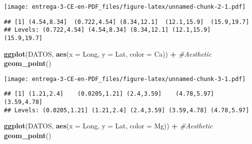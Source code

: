 \documentclass[
]{article}
\newenvironment{Shaded}{\begin{snugshade}}{\end{snugshade}}
\newcommand{\CommentTok}[1]{\textcolor[rgb]{0.56,0.35,0.01}{\textit{#1}}}
\newcommand{\DataTypeTok}[1]{\textcolor[rgb]{0.13,0.29,0.53}{#1}}
\newcommand{\DecValTok}[1]{\textcolor[rgb]{0.00,0.00,0.81}{#1}}
\newcommand{\KeywordTok}[1]{\textcolor[rgb]{0.13,0.29,0.53}{\textbf{#1}}}
\newcommand{\NormalTok}[1]{#1}
\newcommand{\OperatorTok}[1]{\textcolor[rgb]{0.81,0.36,0.00}{\textbf{#1}}}
\newcommand{\StringTok}[1]{\textcolor[rgb]{0.31,0.60,0.02}{#1}}
\begin{document}
\texttt{[image: entrega-3-CE-en-PDF\_files/figure-latex/unnamed-chunk-2-1.pdf]}

\begin{Shaded}
\end{Shaded}

\begin{verbatim}
## [1] (4.54,8.34]  (0.722,4.54] (8.34,12.1]  (12.1,15.9]  (15.9,19.7] 
## Levels: (0.722,4.54] (4.54,8.34] (8.34,12.1] (12.1,15.9] (15.9,19.7]
\end{verbatim}

\begin{Shaded}
\begin{Highlighting}[]
\KeywordTok{ggplot}\NormalTok{(DATOS, }\KeywordTok{aes}\NormalTok{(}\DataTypeTok{x =}\NormalTok{ Long, }\DataTypeTok{y =}\NormalTok{ Lat, }\DataTypeTok{color =}\NormalTok{ Ca)) }\OperatorTok{+}\StringTok{ }\CommentTok{#Aesthetic}
\StringTok{  }\KeywordTok{geom_point}\NormalTok{()}
\end{Highlighting}
\end{Shaded}

\texttt{[image: entrega-3-CE-en-PDF\_files/figure-latex/unnamed-chunk-3-1.pdf]}

\begin{Shaded}
\end{Shaded}

\begin{verbatim}
## [1] (1.21,2.4]    (0.0205,1.21] (2.4,3.59]    (4.78,5.97]   (3.59,4.78]  
## Levels: (0.0205,1.21] (1.21,2.4] (2.4,3.59] (3.59,4.78] (4.78,5.97]
\end{verbatim}

\begin{Shaded}
\begin{Highlighting}[]
\KeywordTok{ggplot}\NormalTok{(DATOS, }\KeywordTok{aes}\NormalTok{(}\DataTypeTok{x =}\NormalTok{ Long, }\DataTypeTok{y =}\NormalTok{ Lat, }\DataTypeTok{color =}\NormalTok{ Mg)) }\OperatorTok{+}\StringTok{ }\CommentTok{#Aesthetic}
\StringTok{  }\KeywordTok{geom_point}\NormalTok{()}
\end{Highlighting}
\end{Shaded}
\end{document}
